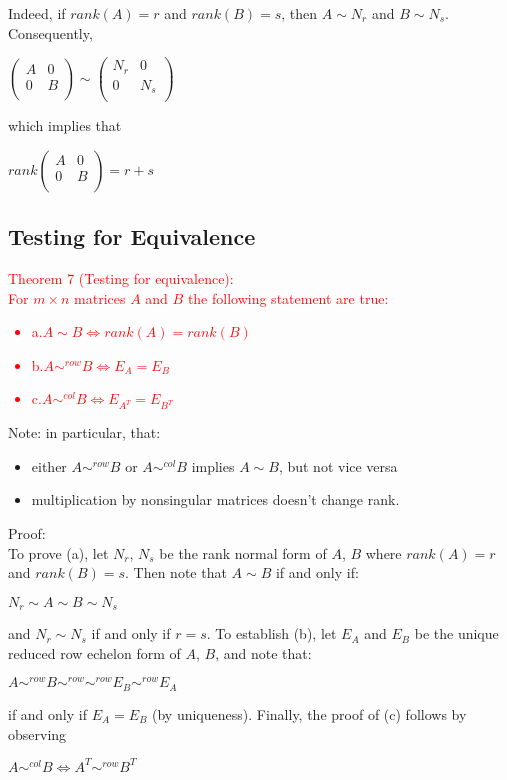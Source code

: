 \documentclass[UTF8,a4paper, 10pt, openany]{svmono}
\begin{document}
Indeed, if $rank(A)=r$ and $rank(B)=s$, then $A\sim N_r$ and $B\sim N_s$.\\
Consequently, 
\begin{center}
$\begin{pmatrix}
A & 0 \\
0 & B \\
\end{pmatrix}\sim 
\begin{pmatrix}
N_r & 0 \\
0 & N_s \\
\end{pmatrix}$
\end{center}
which implies that
\begin{center}
$rank 
\begin{pmatrix}
A & 0 \\
0 & B \\
\end{pmatrix}=r+s$
\end{center}
\subsection{Testing for Equivalence}
\textcolor{red}{Theorem 7 (Testing for equivalence):\\
For $m\times n$ matrices $A$ and $B$ the following statement are true:
\begin{itemize}
\item a.$A\sim B \iff rank(A) = rank(B)$ 
\item b.$A\sim^{row} B \iff E_A = E_B$
\item c.$A\sim^{col} B \iff E_{A^T} = E_{B^T}$
\end{itemize}}
Note: in particular, that:
\begin{itemize}
\item either $A\sim^{row} B$ or $A\sim^{col} B$ implies $A\sim B$, but not vice versa
\item multiplication by nonsingular matrices doesn't change rank.  
\end{itemize}
Proof:\\
To prove (a), let $N_r$, $N_s$ be the rank normal form of $A$, $B$ where $rank(A) =r$ and $rank(B)=s$. Then note that $A\sim B$ if and only if:
\begin{center}
$N_r\sim A\sim B\sim N_s$
\end{center}
and $N_r\sim N_s$ if and only if $r=s$. To establish (b), let $E_A$ and $E_B$ be the unique reduced row echelon form of $A$, $B$, and note that:
\begin{center}
$A\sim^{row}B\sim^{row}\sim^{row}E_B\sim^{row}E_A$
\end{center}
if and only if $E_A=E_B$ (by uniqueness). Finally, the proof of (c) follows by observing
\begin{center}
$A\sim^{col}B \iff A^T \sim^{row}B^T$
\end{center}
\end{document}
